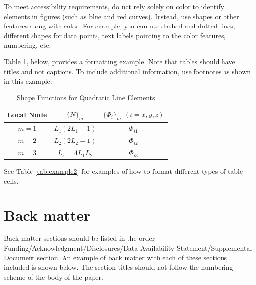 \documentclass{optica-article}
\begin{document}
To meet accessibility requirements, do not rely solely on color to identify elements in figures (such as blue and red curves). Instead, use shapes or other features along with color. For example, you can use dashed and dotted lines, different shapes for data points, text labels pointing to the color features, numbering, etc. 

Table \ref{tab:shape-functions}, below, provides a formatting example. Note that tables should have titles and not captions. To include additional information, use footnotes as shown in this example:

\smallskip

\begin{table}[htbp]
\caption{Shape Functions for Quadratic Line Elements}
  \label{tab:shape-functions}
  \centering
\begin{tabular}{ccc}
\hline
Local Node & $\{N\}_m$ & $\{\Phi_i\}_m$ $(i=x,y,z)$ \\
\hline
$m = 1$ & $L_1(2L_1-1)$ & $\Phi_{i1}$ \\
$m = 2$ & $L_2(2L_2-1)$ & $\Phi_{i2}$ \\
$m = 3$ & $L_3=4L_1L_2$ & $\Phi_{i3}$ \\
\hline
\end{tabular}
\end{table}

\noindent See Table \ref{tab:example2} for examples of how to format different types of table cells.

\clearpage



\section{Back matter}

Back matter sections should be listed in the order Funding/Acknowledgment/Disclosures/Data Availability Statement/Supplemental Document section. An example of back matter with each of these sections included is shown below. The section titles should not follow the numbering scheme of the body of the paper. 
\end{document}
